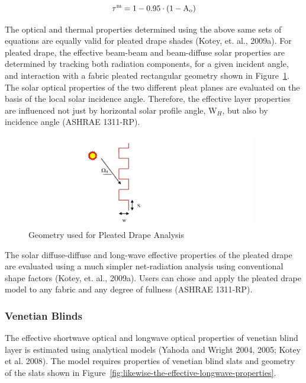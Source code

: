 \begin{equation}
{\tau ^{\rm{m}}} = {\rm{1}} - {\rm{0}}{\rm{.95}} \cdot \left( {{\rm{1}} - {{\rm{A}}_{\rm{o}}}} \right)
\end{equation}

The optical and thermal properties determined using the above same sets of equations are equally valid for pleated drape shades (Kotey, et. al., 2009a). For pleated drape, the effective beam-beam and beam-diffuse solar properties are determined by tracking both radiation components, for a given incident angle, and interaction with a fabric pleated rectangular geometry shown in Figure~\ref{fig:geometry-used-for-pleated-drape-analysis}. The solar optical properties of the two different pleat planes are evaluated on the basis of the local solar incidence angle. Therefore, the effective layer properties are influenced not just by horizontal solar profile angle, W\(_{H}\), but also by incidence angle (ASHRAE 1311-RP).

\begin{figure}[hbtp] %
\centering
\includegraphics[width=0.9\textwidth, height=0.9\textheight, keepaspectratio=true]{media/image1844.svg.png}
\caption{Geometry used for Pleated Drape Analysis \protect \label{fig:geometry-used-for-pleated-drape-analysis}}
\end{figure}

The solar diffuse-diffuse and long-wave effective properties of the pleated drape are evaluated using a much simpler net-radiation analysis using conventional shape factors (Kotey, et. al., 2009a). Users can chose and apply the pleated drape model to any fabric and any degree of fullness (ASHRAE 1311-RP).

\subsubsection{Venetian Blinds}\label{venetian-blinds}

The effective shortwave optical and longwave optical properties of venetian blind layer is estimated using analytical models (Yahoda and Wright 2004, 2005; Kotey et al. 2008). The model requires properties of venetian blind slats and geometry of the slats shown in Figure~\ref{fig:likewise-the-effective-longwave-properties}.

